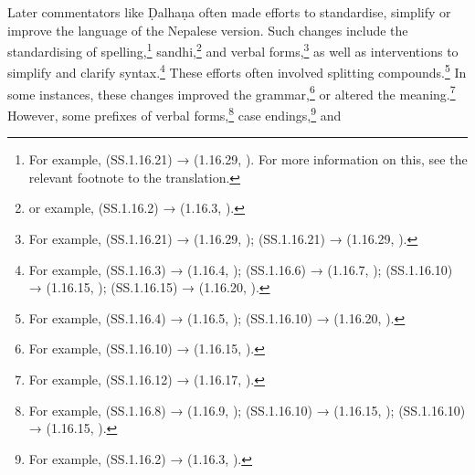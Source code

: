 Later commentators like Ḍalhaṇa often made efforts to standardise, simplify or
improve the language of the Nepalese version. Such changes include the
standardising of spelling,\footnote{For example,  (SS.1.16.21) →
     (1.16.29, \cite[81]{vulgate}). For more information on this, see the
    relevant footnote to the translation.} sandhi,\footnote{or example,  (SS.1.16.2) →  (1.16.3, \cite[76]{vulgate}).} and verbal
        forms,\footnote{For example,  (SS.1.16.21) → 
            (1.16.29, \cite[81]{vulgate});  (SS.1.16.21) → 
            (1.16.29, \cite[81]{vulgate}).} as well as interventions to simplify and clarify
            syntax.\footnote{For example,  (SS.1.16.3) → 
                (1.16.4, \cite[76]{vulgate});  (SS.1.16.6) →
                 (1.16.7, \cite[77]{vulgate}); 
                (SS.1.16.10) →  (1.16.15, \cite[78]{vulgate});
                 (SS.1.16.15) →  (1.16.20, \cite[79]{vulgate}).}
                These efforts often involved splitting compounds.\footnote{For example,
                     (SS.1.16.4) → 
                    (1.16.5, \cite[76]{vulgate});  (SS.1.16.10) →
                     (1.16.20, \cite[78]{vulgate}).} In some 
                    instances,
                    these changes improved the grammar,\footnote{For example, 
                        (SS.1.16.10) →  (1.16.15, \cite[78]{vulgate}).} or 
                        altered
                        the meaning.\footnote{For example,  (SS.1.16.12) → 
                         (1.16.17, \cite[79]{vulgate}).} However, some 
                        prefixes of 
                            verbal
                            forms,\footnote{For example,  (SS.1.16.8) → 
                                (1.16.9, \cite[77]{vulgate});  (SS.1.16.10) → 
                                (1.16.15, \cite[78]{vulgate});  (SS.1.16.10) → 
                                (1.16.15, \cite[78]{vulgate}).} case endings,\footnote{For example, 
                                    (SS.1.16.2) →  (1.16.3, \cite[76]{vulgate}).} and 
